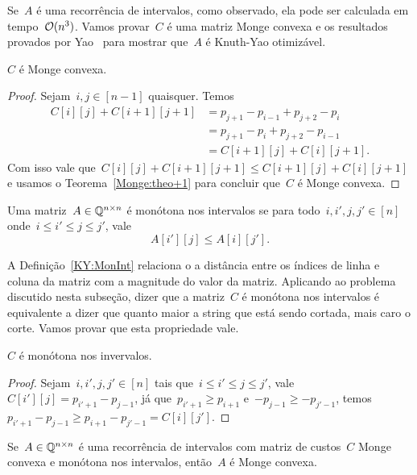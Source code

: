 Se~$A$ é uma recorrência de intervalos, como observado, ela pode ser calculada em tempo~$\mathcal{O}(n^3)$. Vamos provar~$C$ é uma matriz Monge convexa e os resultados provados por Yao~\cite{Yao:1980} para mostrar que~$A$ é Knuth-Yao otimizável.

\begin{prop}
$C$ é Monge convexa.
\end{prop}

\begin{proof}
Sejam~$i,j \in [n-1]$ quaisquer. Temos 
\begin{align*}
    C[i][j] + C[i+1][j+1] &= p_{j+1} - p_{i-1} + p_{j+2} - p_{i} \\
                          &= p_{j+1} - p_{i} + p_{j+2} - p_{i-1} \\
                          &= C[i+1][j] + C[i][j+1] \text{.}
\end{align*}
Com isso vale que~$C[i][j] + C[i+1][j+1] \leq C[i+1][j] + C[i][j+1]$ e usamos o Teorema~\ref{Monge:theo+1} para concluir que~$C$ é Monge convexa.
\end{proof}

\begin{defi} \label{KY:MonInt}
Uma matriz~$A \in \mathbb{Q}^{n \times n}$ é monótona nos intervalos se para todo~$i,i',j,j' \in [n]$ onde~$i \leq i' \leq j \leq j'$, vale
$$A[i'][j] \leq A[i][j'] \text{.}$$
\end{defi}

A Definição~\ref{KY:MonInt} relaciona o a distância entre os índices de linha e coluna da matriz com a magnitude do valor da matriz. Aplicando ao problema discutido nesta subseção, dizer que a matriz~$C$ é monótona nos intervalos é equivalente a dizer que quanto maior a string que está sendo cortada, mais caro o corte. Vamos provar que esta propriedade vale.

\begin{prop}
$C$ é monótona nos invervalos.
\end{prop}

\begin{proof}
Sejam~$i,i',j,j' \in [n]$ tais que~$i \leq i' \leq j \leq j'$, vale~$C[i'][j] = p_{i'+1} - p_{j-1}$, já que~${p_{i'+1} \geq p_{i+1}}$ e~${-p_{j-1} \geq -p_{j'-1}}$, temos~$p_{i'+1} - p_{j-1} \geq p_{i+1} - p_{j'-1} = C[i][j']$.
\end{proof}

\begin{lema}
Se~$A \in \mathbb{Q}^{n \times n}$ é uma recorrência de intervalos com matriz de custos~$C$ Monge convexa e monótona nos intervalos, então~$A$ é Monge convexa.
\end{lema}

